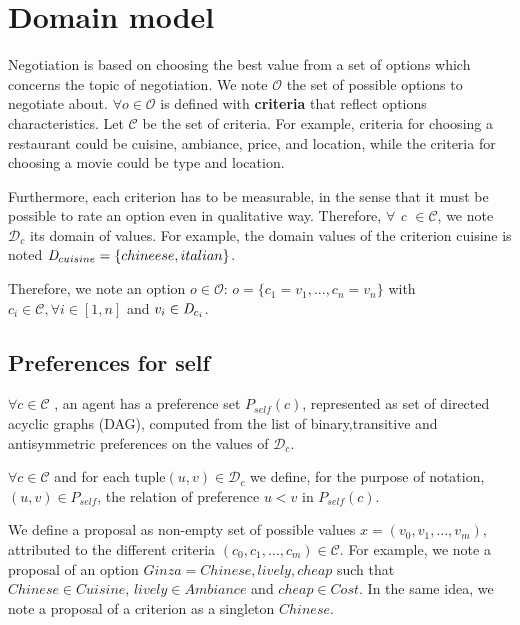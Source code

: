 \documentclass{article}
\begin{document}
		\title{\vskip -10pt}
		
		\author{Lydia Ould Ouali, Charles Rich \and
		Nicolas Sabouret }
		
	
	\section{Domain model}
	Negotiation is based on choosing the best value from a set of options which concerns the topic of negotiation. We note $\mathcal{O}$ the set of possible options to negotiate about. $\forall o \in \mathcal{O}$ is defined with \textbf{criteria} that reflect options characteristics.
	Let $\mathcal{C}$ be the set of criteria. For example, criteria for choosing a restaurant could be cuisine, ambiance, price, and location, while the criteria for choosing a movie could be type and location. 
	
	Furthermore, each criterion has to be measurable, in the sense that it must be possible to rate an option even in qualitative way. Therefore, $\forall$ \emph{c $\in\mathcal{ C}$},  we note $\mathcal{D}_c$ its  domain of values. For example, the domain  values of the criterion cuisine is noted $\emph{D}_{cuisine} = \{chineese, italian\}$.
	
	Therefore, we note an option $o\in \mathcal{O}$:
	$o = \{c_1=v_1,..., c_n=v_n\}$ with $c_i \in \mathcal{C}, \forall i \in [1,n]$ and $v_i\in \emph{D}_{c_i} $. 
	
	\subsection{Preferences for self}
	$\forall c \in \mathcal{C}$ , an agent has a preference set $P_{self}(c)$, represented as set of directed acyclic graphs (DAG), computed from the list of binary,transitive and antisymmetric preferences on the values of $\mathcal{D}_c$.
	
	$\forall c \in \mathcal{C}$ and for each tuple$ (u,v) \in \mathcal{D}_c$ we define, for the purpose of notation, $(u,v) \in P_{self}$, the relation of preference $u<v$ in  $P_{self}(c)$. 
	
	
	We define a proposal as non-empty set of possible values  $x=(v_0,v_1,\ldots,v_m)$, attributed to the different criteria  $(c_0,c_1,\ldots,c_m) \in \mathcal{C}$.
	For example, we note a proposal of an option $Ginza = Chinese, lively, cheap$ such that $Chinese \in Cuisine$, $lively \in Ambiance$ and $cheap \in Cost$. In the same idea, we note a proposal of a criterion as a singleton $Chinese$.
	
\end{document}
